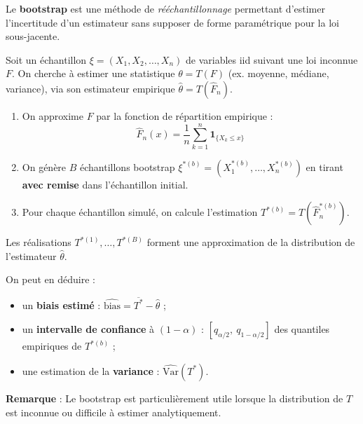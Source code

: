 \begin{f}[Le bootstrap]
	
	Le \textbf{bootstrap} est une méthode de \textit{rééchantillonnage} permettant d’estimer l’incertitude d’un estimateur sans supposer de forme paramétrique pour la loi sous-jacente.
	
	Soit un échantillon \(\xi = (X_1, X_2, \ldots, X_n)\) de variables iid suivant une loi inconnue \(F\). On cherche à estimer une statistique \(\theta = T(F)\) (ex. moyenne, médiane, variance), via son estimateur empirique \(\hat{\theta} = T(\hat{F}_n)\).
	
	\begin{enumerate}
		\item On approxime \(F\) par la fonction de répartition empirique :
		\[
		\hat{F}_n(x) = \frac{1}{n} \sum_{k=1}^n \mathbf{1}_{\{X_k \le x\}}
		\]
		
		\item On génère \(B\) échantillons bootstrap \(\xi^{\ast(b)} = (X_1^{\ast(b)}, \ldots, X_n^{\ast(b)})\) en tirant \textbf{avec remise} dans l’échantillon initial.
		
		\item Pour chaque échantillon simulé, on calcule l’estimation \(T^{\ast(b)} = T(\hat{F}_n^{\ast(b)})\).
	\end{enumerate}
	
	Les réalisations \(T^{\ast(1)}, \ldots, T^{\ast(B)}\) forment une approximation de la distribution de l’estimateur \(\hat{\theta}\).
	
	On peut en déduire :
	\begin{itemize}[nosep]
		\item un \textbf{biais estimé} : \(\widehat{\text{bias}} = \overline{T^\ast} - \hat{\theta}\) ;
		\item un \textbf{intervalle de confiance} à \((1-\alpha)\) : \([q_{\alpha/2},\ q_{1 - \alpha/2}]\) des quantiles empiriques de \(T^{\ast(b)}\) ;
		\item une estimation de la \textbf{variance} : \(\widehat{\mathrm{Var}}(T^\ast)\).
	\end{itemize}
	
	\textbf{Remarque} : Le bootstrap est particulièrement utile lorsque la distribution de \(T\) est inconnue ou difficile à estimer analytiquement.
	
\end{f}
